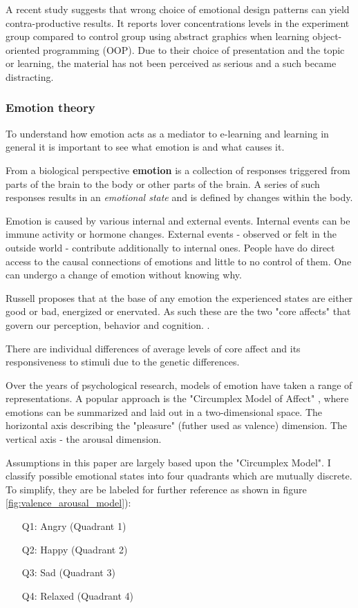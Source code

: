 	A recent study \cite{Haaranen2015} suggests that wrong choice of emotional design patterns can yield contra-productive results. It reports lover concentrations levels in the experiment group compared to control group using abstract graphics when learning object-oriented programming (OOP). Due to their choice of presentation and the topic or learning, the material has not been perceived as serious and a such became distracting.
		
		\subsubsection{Emotion theory} \label{sec:emotion-theory}
		
		To understand how emotion acts as a mediator to e-learning and learning in general it is important to see what emotion is and what causes it.
		
		From a biological perspective \textbf{emotion} is a collection of responses triggered from parts of the brain to the body or other parts of the brain. A series of such responses results in an \textit{emotional state} and is defined by changes within the body. \cite{Damasio1998}
	
		Emotion is caused by various internal and external events. Internal events can be immune activity or hormone changes. External events - observed or felt in the outside world - contribute additionally to internal ones. People have do direct access to the causal connections of emotions and little to no control of them. One can undergo a change of emotion without knowing why. \cite{Russell2003}
		
		Russell proposes that at the base of any emotion the experienced states are either good or bad, energized or enervated. As such these are the two "core affects" that govern our perception, behavior and cognition. \cite{Russell2003}. 
		
		There are individual differences of average levels of core affect and its responsiveness to stimuli due to the genetic differences. \cite{Russell2003}
		
		Over the years of psychological research, models of emotion have taken a range of representations. 
		A popular approach is the "Circumplex Model of Affect" \cite{Russell1980}, where emotions can be summarized and laid out in a two-dimensional space. The horizontal axis describing the "pleasure" (futher used as valence) dimension. The vertical axis - the arousal dimension.
		
		Assumptions in this paper are largely based upon the "Circumplex Model". I classify possible emotional states into four quadrants which are mutually discrete. To simplify, they are be labeled for further reference as shown in figure \ref{fig:valence_arousal_model}):
		\begin{enumerate}
			\item[Q1:] Angry (Quadrant 1)
			\item[Q2:] Happy (Quadrant 2)
			\item[Q3:] Sad (Quadrant 3)
			\item[Q4:] Relaxed (Quadrant 4)
		\end{enumerate}
		
